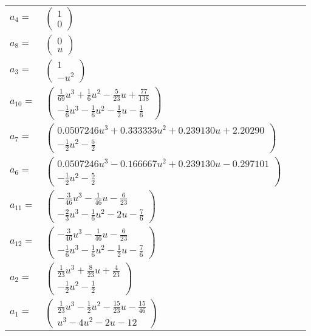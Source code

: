 \documentclass[1p]{elsarticle_modified}
\theoremstyle{definition}
\begin{document}
\begin{tabular}{m{7pt} m{180pt} m{7pt} m{180pt} }
\flushright $a_{4}=$&$\begin{pmatrix}1\\0\end{pmatrix}$ \\
\flushright $a_{8}=$&$\begin{pmatrix}0\\u\end{pmatrix}$ \\
\flushright $a_{3}=$&$\begin{pmatrix}1\\- u^2\end{pmatrix}$ \\
\flushright $a_{10}=$&$\begin{pmatrix}\frac{1}{69} u^3+\frac{1}{6} u^2-\frac{5}{23} u+\frac{77}{138}\\-\frac{1}{6} u^3-\frac{1}{6} u^2-\frac{1}{2} u-\frac{1}{6}\end{pmatrix}$ \\
\flushright $a_{7}=$&$\begin{pmatrix}0.0507246 u^{3}+0.333333 u^{2}+0.239130 u+2.20290\\-\frac{1}{2} u^2-\frac{5}{2}\end{pmatrix}$ \\
\flushright $a_{6}=$&$\begin{pmatrix}0.0507246 u^{3}-0.166667 u^{2}+0.239130 u-0.297101\\-\frac{1}{2} u^2-\frac{5}{2}\end{pmatrix}$ \\
\flushright $a_{11}=$&$\begin{pmatrix}-\frac{3}{46} u^3-\frac{1}{46} u-\frac{6}{23}\\-\frac{2}{3} u^3-\frac{1}{6} u^2-2 u-\frac{7}{6}\end{pmatrix}$ \\
\flushright $a_{12}=$&$\begin{pmatrix}-\frac{3}{46} u^3-\frac{1}{46} u-\frac{6}{23}\\-\frac{1}{6} u^3-\frac{1}{6} u^2-\frac{1}{2} u-\frac{7}{6}\end{pmatrix}$ \\
\flushright $a_{2}=$&$\begin{pmatrix}\frac{1}{23} u^3+\frac{8}{23} u+\frac{4}{23}\\-\frac{1}{2} u^2-\frac{1}{2}\end{pmatrix}$ \\
\flushright $a_{1}=$&$\begin{pmatrix}\frac{1}{23} u^3-\frac{1}{2} u^2-\frac{15}{23} u-\frac{15}{46}\\u^3-4 u^2-2 u-12\end{pmatrix}$ \\

\end{tabular}
\end{document}
